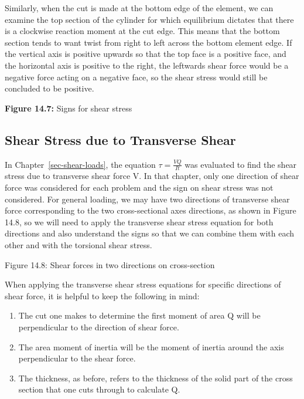 \documentclass[
  letterpaper,
  DIV=11,
  numbers=noendperiod]{scrreprt}
\providecommand{\tightlist}{%
  \setlength{\itemsep}{0pt}\setlength{\parskip}{0pt}}\usepackage{longtable,booktabs,array}
\theoremstyle{definition}
\theoremstyle{remark}
\begin{document}
Similarly, when the cut is made at the bottom edge of the element, we
can examine the top section of the cylinder for which equilibrium
dictates that there is a clockwise reaction moment at the cut edge. This
means that the bottom section tends to want twist from right to left
across the bottom element edge. If the vertical axis is positive upwards
so that the top face is a positive face, and the horizontal axis is
positive to the right, the leftwards shear force would be a negative
force acting on a negative face, so the shear stress would still be
concluded to be positive.

\textbf{Figure 14.7:} Signs for shear stress

\subsection{Shear Stress due to Transverse
Shear}\label{shear-stress-due-to-transverse-shear}

In Chapter~\ref{sec-shear-loads}, the equation \(\tau=\frac{V Q}{I t}\)
was evaluated to find the shear stress due to transverse shear force V.
In that chapter, only one direction of shear force was considered for
each problem and the sign on shear stress was not considered. For
general loading, we may have two directions of transverse shear force
corresponding to the two cross-sectional axes directions, as shown in
Figure 14.8, so we will need to apply the transverse shear stress
equation for both directions and also understand the signs so that we
can combine them with each other and with the torsional shear stress.

Figure 14.8: Shear forces in two directions on cross-section

When applying the transverse shear stress equations for specific
directions of shear force, it is helpful to keep the following in mind:

\begin{enumerate}
\def\labelenumi{\arabic{enumi}.}
\tightlist
\item
  The cut one makes to determine the first moment of area Q will be
  perpendicular to the direction of shear force.
\item
  The area moment of inertia will be the moment of inertia around the
  axis perpendicular to the shear force.
\item
  The thickness, as before, refers to the thickness of the solid part of
  the cross section that one cuts through to calculate Q.
\end{enumerate}
\end{document}
